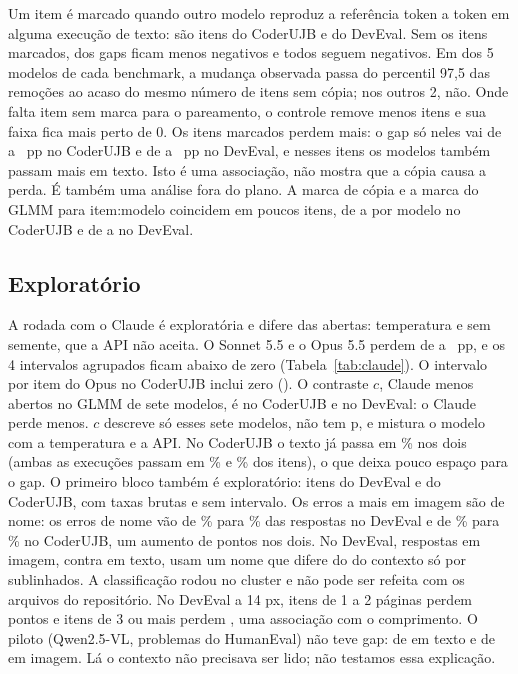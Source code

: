 Um item é marcado quando outro modelo reproduz a referência token a token em alguma execução de texto: são \copiedItemsUjb{} itens do CoderUJB e \copiedItemsDev{} do DevEval. Sem os itens marcados, \contamShrinking{} dos \contamGaps{} gaps ficam menos negativos e todos seguem negativos. Em \controlHighModelsUjb{} dos 5 modelos de cada benchmark, a mudança observada passa do percentil 97,5 das remoções ao acaso do mesmo número de itens sem cópia; nos outros 2, não. Onde falta item sem marca para o pareamento, o controle remove menos itens e sua faixa fica mais perto de 0. Os itens marcados perdem mais: o gap só neles vai de \flaggedGapMinUjb{} a \flaggedGapMaxUjb~pp no CoderUJB e de \flaggedGapMinDev{} a \flaggedGapMaxDev~pp no DevEval, e nesses itens os modelos também passam mais em texto. Isto é uma associação, não mostra que a cópia causa a perda. É também uma análise fora do plano. A marca de cópia e a marca do GLMM para item:modelo coincidem em poucos itens, de \flagBothMinUjb{} a \flagBothMaxUjb{} por modelo no CoderUJB e de \flagBothMinDev{} a \flagBothMaxDev{} no DevEval.

\subsection{Exploratório}
\label{sec:explor}

A rodada com o Claude é exploratória e difere das abertas: temperatura \claudeTemperature{} e sem semente, que a API não aceita. O Sonnet 5.5 e o Opus 5.5 perdem de \claudeLossMinAll{} a \claudeLossMaxAll~pp, e os 4 intervalos agrupados ficam abaixo de zero (Tabela~\ref{tab:claude}). O intervalo por item do Opus no CoderUJB inclui zero (\ci{\gapItemOpusUjbLo}{\gapItemOpusUjbHi}). O contraste $c$, Claude menos abertos no GLMM de sete modelos, é \openClosedCUjb{} \ci{\openClosedCUjbLo}{\openClosedCUjbHi} no CoderUJB e \openClosedCDev{} \ci{\openClosedCDevLo}{\openClosedCDevHi} no DevEval: o Claude perde menos. $c$ descreve só esses sete modelos, não tem p, e mistura o modelo com a temperatura e a API. No CoderUJB o texto já passa em \textRateSonnetUjb{}\% nos dois (ambas as execuções passam em \ceilingTextSonnetUjb{}\% e \ceilingTextOpusUjb{}\% dos itens), o que deixa pouco espaço para o gap. O primeiro bloco também é exploratório: \blockOneItemsDev{} itens do DevEval e \blockOneItemsUjb{} do CoderUJB, com taxas brutas e sem intervalo. Os erros a mais em imagem são de nome: os erros de nome vão de \nameDevText{}\% para \nameDevImage{}\% das respostas no DevEval e de \nameUjbText{}\% para \nameUjbImage{}\% no CoderUJB, um aumento de \nameErrorGrowthPoints{} pontos nos dois. No DevEval, \nameErrorNearCopies{} respostas em imagem, contra \nameErrorTextNearCopies{} em texto, usam um nome que difere do do contexto só por sublinhados. A classificação rodou no cluster e não pode ser refeita com os arquivos do repositório. No DevEval a 14 px, itens de 1 a 2 páginas perdem \lengthGapShort{} pontos e itens de 3 ou mais perdem \lengthGapLong, uma associação com o comprimento. O piloto (Qwen2.5-VL, \pilotProblems{} problemas do HumanEval) não teve gap: \pilotTextPass{} de \pilotOf{} em texto e \pilotImagePass{} de \pilotOf{} em imagem. Lá o contexto não precisava ser lido; não testamos essa explicação.
